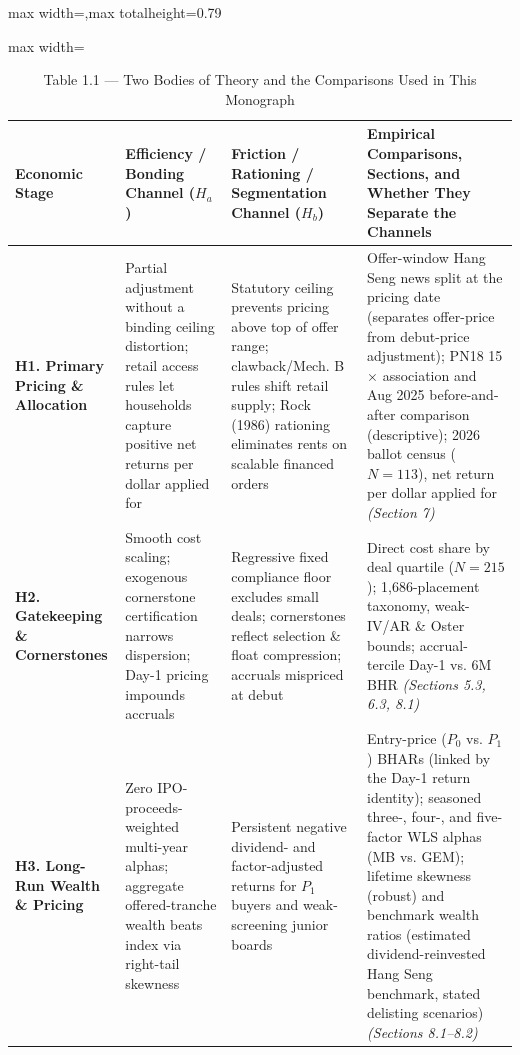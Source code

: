 \documentclass[11pt,letterpaper]{article}
\begin{document}
\begin{table}[!htbp]
\centering
\caption*{Table 1.1 — Two Bodies of Theory and the Comparisons Used in This Monograph}
\begin{adjustbox}{max width=\textwidth,max totalheight=0.79\textheight}
\begin{minipage}{\textwidth}\centering
\footnotesize
\setlength{\tabcolsep}{3.5pt}
\renewcommand{\arraystretch}{1.18}
\begin{adjustbox}{max width=\textwidth}
\begin{tabular}{>{\raggedright\arraybackslash}p{2.76cm}>{\raggedright\arraybackslash}p{4.35cm}>{\raggedright\arraybackslash}p{4.35cm}>{\raggedright\arraybackslash}p{4.35cm}}
\toprule
Economic Stage & Efficiency / Bonding Channel ($H_a$) & Friction / Rationing / Segmentation Channel ($H_b$) & Empirical Comparisons, Sections, and Whether They Separate the Channels \\
\midrule
\textbf{H1. Primary Pricing \& Allocation} & Partial adjustment without a binding ceiling distortion; retail access rules let households capture positive net returns per dollar applied for & Statutory ceiling prevents pricing above top of offer range; clawback/Mech. B rules shift retail supply; Rock (1986) rationing eliminates rents on scalable financed orders & Offer-window Hang Seng news split at the pricing date (separates offer-price from debut-price adjustment); PN18 15$\times$ association and Aug 2025 before-and-after comparison (descriptive); 2026 ballot census ($N=113$), net return per dollar applied for \textit{(Section 7)} \\
\textbf{H2. Gatekeeping \& Cornerstones} & Smooth cost scaling; exogenous cornerstone certification narrows dispersion; Day-1 pricing impounds accruals & Regressive fixed compliance floor excludes small deals; cornerstones reflect selection \& float compression; accruals mispriced at debut & Direct cost share by deal quartile ($N=215$); 1,686-placement taxonomy, weak-IV/AR \& Oster bounds; accrual-tercile Day-1 vs. 6M BHR \textit{(Sections 5.3, 6.3, 8.1)} \\
\textbf{H3. Long-Run Wealth \& Pricing} & Zero IPO-proceeds-weighted multi-year alphas; aggregate offered-tranche wealth beats index via right-tail skewness & Persistent negative dividend- and factor-adjusted returns for $P_1$ buyers and weak-screening junior boards & Entry-price ($P_0$ vs. $P_1$) BHARs (linked by the Day-1 return identity); seasoned three-, four-, and five-factor WLS alphas (MB vs. GEM); lifetime skewness (robust) and benchmark wealth ratios (estimated dividend-reinvested Hang Seng benchmark, stated delisting scenarios) \textit{(Sections 8.1–8.2)} \\

\end{tabular}
\end{adjustbox}
\end{minipage}
\end{adjustbox}
\end{table}
\end{document}
